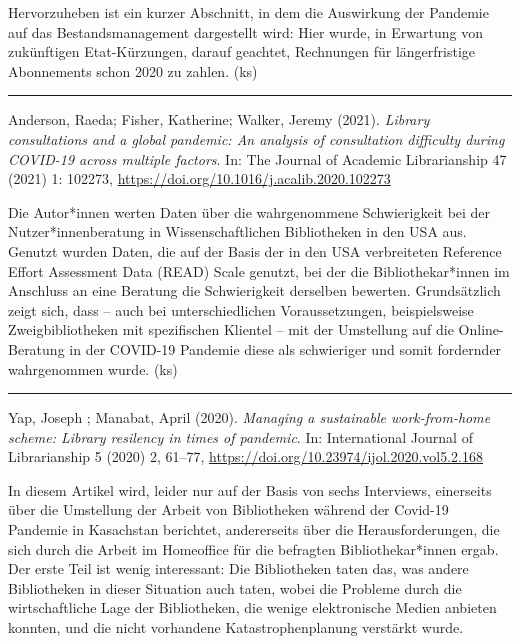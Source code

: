 \documentclass[a4paper,
fontsize=11pt,
oneside,
numbers=noperiodatend,
parskip=half-,
bibliography=totoc,
final
]{scrartcl}
\begin{document}
Hervorzuheben ist ein kurzer Abschnitt, in dem die Auswirkung der
Pandemie auf das Bestandsmanagement dargestellt wird: Hier wurde, in
Erwartung von zukünftigen Etat-Kürzungen, darauf geachtet, Rechnungen
für längerfristige Abonnements schon 2020 zu zahlen. (ks)

\begin{center}\rule{0.5\linewidth}{0.5pt}\end{center}

Anderson, Raeda; Fisher, Katherine; Walker, Jeremy (2021). \emph{Library
consultations and a global pandemic: An analysis of consultation
difficulty during COVID-19 across multiple factors}. In: The Journal of
Academic Librarianship 47 (2021) 1: 102273,
\url{https://doi.org/10.1016/j.acalib.2020.102273}

Die Autor*innen werten Daten über die wahrgenommene Schwierigkeit bei
der Nutzer*innen\-beratung in Wissenschaftlichen Bibliotheken in den USA
aus. Genutzt wurden Daten, die auf der Basis der in den USA verbreiteten
Reference Effort Assessment Data (READ) Scale genutzt, bei der die
Bibliothekar*innen im Anschluss an eine Beratung die Schwierigkeit
derselben bewerten. Grundsätzlich zeigt sich, dass -- auch bei
unterschiedlichen Voraussetzungen, beispielsweise Zweigbibliotheken mit
spezifischen Klientel -- mit der Umstellung auf die Online-Beratung in
der COVID-19 Pandemie diese als schwieriger und somit fordernder
wahrgenommen wurde. (ks)

\begin{center}\rule{0.5\linewidth}{0.5pt}\end{center}

Yap, Joseph ; Manabat, April (2020). \emph{Managing a sustainable
work-from-home scheme: Library resilency in times of pandemic}. In:
International Journal of Librarianship 5 (2020) 2, 61--77,
\url{https://doi.org/10.23974/ijol.2020.vol5.2.168}

In diesem Artikel wird, leider nur auf der Basis von sechs Interviews,
einerseits über die Umstellung der Arbeit von Bibliotheken während der
Covid-19 Pandemie in Kasachstan berichtet, andererseits über die
Herausforderungen, die sich durch die Arbeit im Homeoffice für die
befragten Bibliothekar*innen ergab. Der erste Teil ist wenig
interessant: Die Bibliotheken taten das, was andere Bibliotheken in
dieser Situation auch taten, wobei die Probleme durch die
wirtschaftliche Lage der Bibliotheken, die wenige elektronische Medien
anbieten konnten, und die nicht vorhandene Katastrophenplanung verstärkt
wurde.
\end{document}
